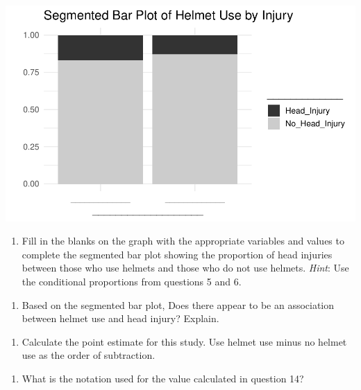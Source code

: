 \documentclass[
]{report}
\providecommand{\tightlist}{%
  \setlength{\itemsep}{0pt}\setlength{\parskip}{0pt}}
\begin{document}
\begin{center}\includegraphics[width=0.7\linewidth]{07-inference-2cat_files/figure-latex/unnamed-chunk-2-1} \end{center}

\begin{enumerate}
\def\labelenumi{\arabic{enumi}.}
\setcounter{enumi}{11}
\tightlist
\item
  Fill in the blanks on the graph with the appropriate variables and values to complete the segmented bar plot showing the proportion of head injuries between those who use helmets and those who do not use helmets. \emph{Hint}: Use the conditional proportions from questions 5 and 6.
\end{enumerate}

\vspace{0.1in}

\begin{enumerate}
\def\labelenumi{\arabic{enumi}.}
\setcounter{enumi}{12}
\tightlist
\item
  Based on the segmented bar plot, Does there appear to be an association between helmet use and head injury? Explain.
\end{enumerate}

\vspace{1in}

\begin{enumerate}
\def\labelenumi{\arabic{enumi}.}
\setcounter{enumi}{13}
\tightlist
\item
  Calculate the point estimate for this study. Use helmet use minus no helmet use as the order of subtraction.
\end{enumerate}

\vspace{1in}

\begin{enumerate}
\def\labelenumi{\arabic{enumi}.}
\setcounter{enumi}{14}
\tightlist
\item
  What is the notation used for the value calculated in question 14?
\end{enumerate}
\end{document}
